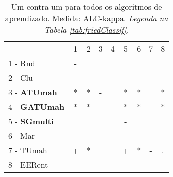 \begin{table}[h]
\caption{Um contra um para todos os algoritmos de aprendizado. Medida: ALC-kappa. \textit{Legenda na Tabela \ref{tab:friedClassif}.}}
\begin{center}\begin{tabular}{lcc|cc|cc|cc}
      			         & 1 & 2 & 3 & 4 & 5 & 6 & 7 & 8\\
1 - Rnd                       & - &   &   &   &   &   &   &   \\
2 - Clu  	                &   & - &   &   &   &   &   &   \\ \hline
3 - \textbf{ATUmah}	& * & *  & - &   & *  & * &  & *   \\
4 - \textbf{GATUmah}	& * & * &   & - & * & * &   & * \\ \hline
5 - \textbf{SGmulti}	&   &   &   &    & - &   &   &   \\
6 - Mar  	                &   &   &   &   &   & - &   &   \\ \hline
7 - TUmah	                & + & * &   &   & + & * & - & . \\
8 - EERent	                &   &   &   &   &   &   &   & - \\ \hline\end{tabular}
\label{stratsALCKappaFriedAllRiscoReduxall}
\end{center}
\end{table}